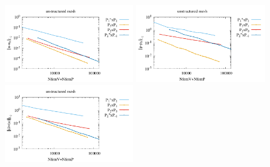 \begin{center}
\includegraphics[width=5.7cm]{python_codes/fieldstone_120/paperresults/tesk12_unstructured_errorsV2.pdf}
\includegraphics[width=5.7cm]{python_codes/fieldstone_120/paperresults/tesk12_unstructured_errorsP2.pdf}
\includegraphics[width=5.7cm]{python_codes/fieldstone_120/paperresults/tesk12_unstructured_errors_divv2.pdf}\\
\end{center}

